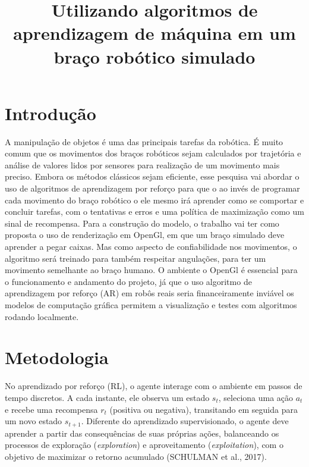 \documentclass[conference]{IEEEtran}
\begin{document}
\title{Utilizando algoritmos de aprendizagem de máquina em um braço robótico simulado }

\author{
}

\maketitle

\section{Introdução}
A manipulação de objetos é uma das principais  tarefas da robótica. É muito comum que os movimentos dos braços robóticos sejam calculados por trajetória e análise de valores lidos por sensores para realização de um movimento mais preciso. Embora os métodos clássicos sejam eficiente, esse pesquisa vai abordar o uso de algoritmos de aprendizagem por reforço para que o ao invés de programar cada movimento do braço robótico o ele mesmo irá aprender como se comportar e concluir tarefas, com o tentativas e erros e uma política de maximização como um sinal de recompensa.
Para a construção do modelo, o trabalho vai ter como proposta o uso de renderização em OpenGl, em que um braço simulado deve aprender a pegar caixas. Mas como aspecto de confiabilidade nos movimentos, o algoritmo será treinado para também respeitar angulações, para ter um movimento semelhante ao braço humano.
O ambiente o OpenGl é essencial para o funcionamento e andamento do projeto, já que o uso algoritmo de aprendizagem por reforço (AR) em robôs reais seria financeiramente inviável os modelos de computação gráfica permitem a visualização e testes com algoritmos rodando localmente.

\section{Metodologia}
No aprendizado por reforço (RL), o agente interage com o ambiente em passos de tempo discretos. A cada instante, ele observa um estado $s_t$, seleciona uma ação $a_t$ e recebe uma recompensa $r_t$ (positiva ou negativa), transitando em seguida para um novo estado $s_{t+1}$. Diferente do aprendizado supervisionado, o agente deve aprender a partir das consequências de suas próprias ações, balanceando os processos de exploração (\textit{exploration}) e aproveitamento (\textit{exploitation}), com o objetivo de maximizar o retorno acumulado (SCHULMAN et al., 2017).
\end{document}
